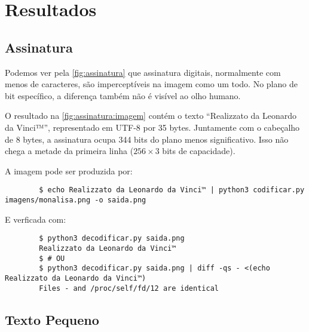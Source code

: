 \section{Resultados}

\subsection{Assinatura}

    Podemos ver pela \cref{fig:assinatura} que assinatura digitais, normalmente com menos de caracteres, são imperceptíveis na imagem como um todo. No plano de bit específico, a diferença também não é visível ao olho humano.

    O resultado na \cref{fig:assinatura:imagem} contém o texto ``Realizzato da Leonardo da Vinci™'', representado em UTF-8 por 35 bytes. Juntamente com o cabeçalho de 8 bytes, a assinatura ocupa 344 bits do plano menos significativo. Isso não chega a metade da primeira linha ($256 \times 3$ bits de capacidade).

    A imagem pode ser produzida por:

    \begin{verbatim}
        $ echo Realizzato da Leonardo da Vinci™ | python3 codificar.py imagens/monalisa.png -o saida.png
    \end{verbatim}

    E verficada com:

    \begin{verbatim}
        $ python3 decodificar.py saida.png
        Realizzato da Leonardo da Vinci™
        $ # OU
        $ python3 decodificar.py saida.png | diff -qs - <(echo Realizzato da Leonardo da Vinci™)
        Files - and /proc/self/fd/12 are identical
    \end{verbatim}

    

\subsection{Texto Pequeno}

    

%
%
%
